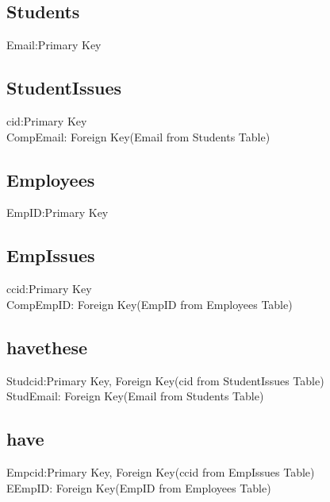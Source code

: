 \documentclass{article}
\begin{document}
\subsection{Students}
Email:Primary Key

\subsection{StudentIssues}
cid:Primary Key\\
CompEmail: Foreign Key(Email from Students Table)

\subsection{Employees}
EmpID:Primary Key

\subsection{EmpIssues}
ccid:Primary Key\\
CompEmpID: Foreign Key(EmpID from Employees Table)

\subsection{havethese}
Studcid:Primary Key, Foreign Key(cid from StudentIssues Table)\\
StudEmail: Foreign Key(Email from Students Table)

\subsection{have}
Empcid:Primary Key, Foreign Key(ccid from EmpIssues Table)\\
EEmpID: Foreign Key(EmpID from Employees Table)
\end{document}
